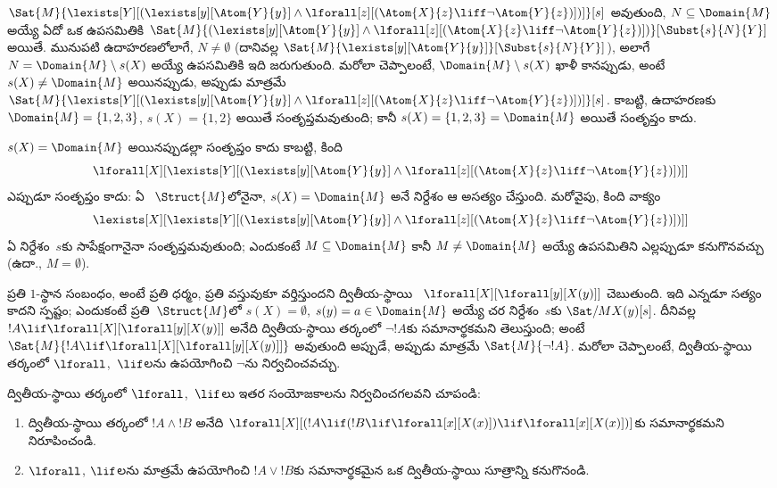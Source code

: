 \documentclass[../../../include/open-logic-section]{subfiles}
\begin{document}
\begin{ex}
  $\Sat{M}{\lexists[Y][(\lexists[y][\Atom{Y}{y}] \land
  \lforall[z][(\Atom{X}{z} \liff \lnot \Atom{Y}{z})])]}[s]$ అవుతుంది,
$N \subseteq \Domain{M}$ అయ్యే ఏదో ఒక ఉపసమితికి
  $\Sat{M}{(\lexists[y][\Atom{Y}{y}] \land \lforall[z][(\Atom{X}{z}
  \liff \lnot \Atom{Y}{z})])}[\Subst{s}{N}{Y}]$ అయితే. మునుపటి
  ఉదాహరణలోలాగే, $N \neq \emptyset$ (దానివల్ల
  $\Sat{M}{\lexists[y][\Atom{Y}{y}]}[\Subst{s}{N}{Y}]$), అలాగే
$N = \Domain{M} \setminus s(X)$ అయ్యే ఉపసమితికి ఇది జరుగుతుంది. మరోలా
  చెప్పాలంటే, $\Domain{M} \setminus s(X)$ ఖాళీ కానప్పుడు, అంటే
  $s(X) \neq \Domain{M}$ అయినప్పుడు, అప్పుడు మాత్రమే
  $\Sat{M}{\lexists[Y][(\lexists[y][\Atom{Y}{y}] \land
  \lforall[z][(\Atom{X}{z} \liff \lnot \Atom{Y}{z})])]}[s]$.
  కాబట్టి, ఉదాహరణకు $\Domain{M} = \{1, 2, 3\}$,
  $s(X) = \{1, 2\}$ అయితే  సంతృప్తమవుతుంది; కానీ
  $s(X) = \{1, 2, 3\} = \Domain{M}$ అయితే సంతృప్తం కాదు.

  $s(X) = \Domain{M}$ అయినప్పుడల్లా  సంతృప్తం కాదు కాబట్టి,
  కింది 
  \[
  \lforall[X][\lexists[Y][(\lexists[y][\Atom{Y}{y}] \land
      \lforall[z][(\Atom{X}{z} \liff \lnot \Atom{Y}{z})])]]
  \]
  ఎప్పుడూ సంతృప్తం కాదు: ఏ ~$\Struct{M}$లోనైనా,
  $s(X) = \Domain{M}$ అనే నిర్దేశం ఆ  అసత్యం చేస్తుంది.
  మరోవైపు, కింది వాక్యం
  \[
  \lexists[X][\lexists[Y][(\lexists[y][\Atom{Y}{y}] \land
      \lforall[z][(\Atom{X}{z} \liff \lnot \Atom{Y}{z})])]]
  \]
  ఏ నిర్దేశం~$s$కు సాపేక్షంగానైనా సంతృప్తమవుతుంది; ఎందుకంటే
  $M \subseteq \Domain{M}$ కానీ $M \neq \Domain{M}$ అయ్యే ఉపసమితిని
  ఎల్లప్పుడూ కనుగొనవచ్చు (ఉదా., $M = \emptyset$).
\end{ex}

\begin{ex}
  ప్రతి $1$-స్థాన సంబంధం, అంటే ప్రతి ధర్మం, ప్రతి వస్తువుకూ వర్తిస్తుందని
  ద్వితీయ-స్థాయి ~$\lforall[X][\lforall[y][X(y)]]$
  చెబుతుంది. ఇది ఎన్నడూ సత్యం కాదని స్పష్టం; ఎందుకంటే ప్రతి~$\Struct{M}$లో
  $s(X) = \emptyset$, $s(y) = a \in \Domain{M}$ అయ్యే చర నిర్దేశం~$s$కు
  $\Sat/{M}{X(y)}[s]$. దీనివల్ల $!A \lif
  \lforall[X][\lforall[y][X(y)]]$ అనేది ద్వితీయ-స్థాయి తర్కంలో
  $\lnot !A$కు సమానార్థకమని తెలుస్తుంది; అంటే $\Sat{M}{!A \lif
  \lforall[X][\lforall[y][X(y)]]}$ అవుతుంది అప్పుడే, అప్పుడు మాత్రమే
  $\Sat{M}{\lnot !A}$. మరోలా చెప్పాలంటే, ద్వితీయ-స్థాయి తర్కంలో
  $\lforall$,~$\lif$లను ఉపయోగించి $\lnot$ను నిర్వచించవచ్చు.
\end{ex}

\begin{prob}
  ద్వితీయ-స్థాయి తర్కంలో $\lforall$,~$\lif$లు ఇతర సంయోజకాలను
  నిర్వచించగలవని చూపండి:
  \begin{enumerate}
    \item ద్వితీయ-స్థాయి తర్కంలో $!A \land !B$ అనేది
    $\lforall[X][(!A \lif (!B \lif \lforall[x][X(x)])\lif
    \lforall[x][X(x)])]$కు సమానార్థకమని నిరూపించండి.
    \item $\lforall$, $\lif$లను మాత్రమే ఉపయోగించి $!A \lor !B$కు
    సమానార్థకమైన ఒక ద్వితీయ-స్థాయి సూత్రాన్ని కనుగొనండి.
  \end{enumerate}
\end{prob}
\end{document}
